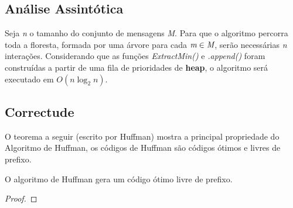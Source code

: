 \subsection{Análise Assintótica}
Seja \emph{n} o tamanho do conjunto de mensagens \emph{M}. Para que o algoritmo percorra toda a floresta, formada por uma árvore para cada $\emph{m} \in \emph{M}$, serão necessárias \emph{n} interações.
Considerando que as funções \emph{ExtractMin()} e \emph{.append()} foram construídas a partir de uma fila de prioridades de \textbf{heap}, o algoritmo será executado em  $O(n \log_2 n)$.

\subsection{Correctude}
O teorema a seguir (escrito por Huffman) mostra a principal propriedade do Algoritmo de Huffman, os códigos de Huffman são códigos ótimos e livres de prefixo.

\begin{theorem} O algoritmo de Huffman gera um código ótimo livre de prefixo.
\begin{proof}
\end{proof}
\end{theorem}







